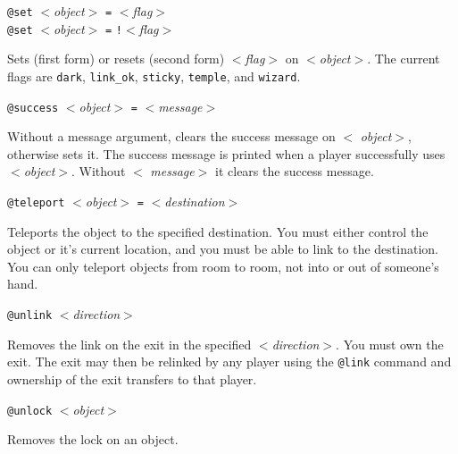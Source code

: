\begin{simple}
\dorule

\item[]
\begin{flushleft}
{\tt @set} $<${\em object\/}$>$ \verb|=| $<${\em flag\/}$>$ \\
{\tt @set} $<${\em object\/}$>$ \verb|=| {\tt !}$<${\em flag\/}$>$
\end{flushleft}
Sets (first form) or resets (second form) $<${\em flag\/}$>$ on
$<${\em object\/}$>$.  The current flags are \verb|dark|,
\verb|link_ok|, \verb|sticky|, \verb|temple|, and \verb|wizard|.

\dorule

\item[]
\begin{flushleft}
{\tt @success} $<${\em object\/}$>$ \verb|=| $<${\em message\/}$>$
\end{flushleft}
Without a message argument, clears the success message on $<${\em
object\/}$>$, otherwise sets it.  The success message is printed when
a player successfully uses $<${\em object\/}$>$.  Without $<${\em
message}$>$ it clears the success message.

\dorule

\item[]
\begin{flushleft}
{\tt @teleport} $<${\em object\/}$>$ {\tt =} $<${\em destination\/}$>$
\end{flushleft}
Teleports the object to the specified destination.  You must either
control the object or it's current location, and you must be able to
link to the destination. You can only teleport objects from room to
room, not into or out of someone's hand.

\dorule

\item[]
\begin{flushleft}
{\tt @unlink} $<${\em direction\/}$>$
\end{flushleft}
Removes the link on the exit in the specified $<${\em direction\/}$>$.
You must own the exit.  The exit may then be relinked by any player
using the {\tt @link} command and ownership of the exit transfers to
that player.

\dorule

\item[]
\begin{flushleft}
{\tt @unlock} $<${\em object\/}$>$
\end{flushleft}
Removes the lock on an object.

\end{simple}

